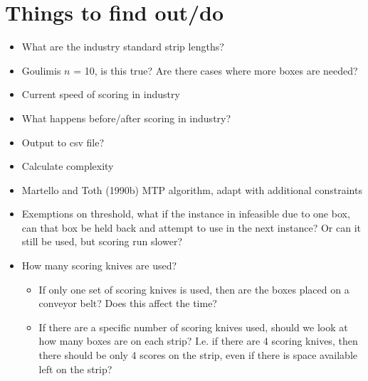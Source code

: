 \documentclass[a4paper, 11pt, twoside, onecolumn, openany]{article}
\begin{document}
\section{Things to find out/do}
\begin{itemize}
	\item What are the industry standard strip lengths?
	\item Goulimis $n$ = 10, is this true? Are there cases where more boxes are needed?
	\item Current speed of scoring in industry
	\item What happens before/after scoring in industry?
	\item Output to csv file?
	\item Calculate complexity
	\item Martello and Toth (1990b) MTP algorithm, adapt with additional constraints
	\item Exemptions on threshold, what if the instance in infeasible due to one box, can that box be held back and attempt to use in the next instance? Or can it still be used, but scoring run slower?
	\item How many scoring knives are used?
	\begin{itemize}
		\item If only one set of scoring knives is used, then are the boxes placed on a conveyor belt? Does this affect the time?
		\item If there are a specific number of scoring knives used, should we look at how many boxes are on each strip? I.e. if there are 4 scoring knives, then there should be only 4 scores on the strip, even if there is space available left on the strip?
		
	\end{itemize}
	
\end{itemize}
\end{document}
